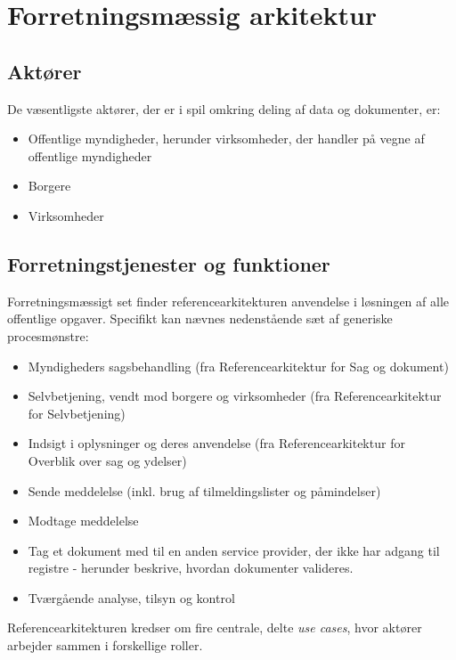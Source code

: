 \section{Forretningsmæssig
arkitektur}\label{forretningsmuxe6ssig-arkitektur}

\subsection{Aktører}\label{aktuxf8rer}

De væsentligste aktører, der er i spil omkring deling af data og
dokumenter, er:

\begin{itemize}
\tightlist
\item
  Offentlige myndigheder, herunder virksomheder, der handler på vegne af
  offentlige myndigheder
\item
  Borgere
\item
  Virksomheder
\end{itemize}

\subsection{Forretningstjenester og
funktioner}\label{forretningstjenester-og-funktioner}

Forretningsmæssigt set finder referencearkitekturen anvendelse i
løsningen af alle offentlige opgaver. Specifikt kan nævnes nedenstående
sæt af generiske procesmønstre:

\begin{itemize}
\tightlist
\item
  Myndigheders sagsbehandling (fra Referencearkitektur for Sag og
  dokument)
\item
  Selvbetjening, vendt mod borgere og virksomheder (fra
  Referencearkitektur for Selvbetjening)
\item
  Indsigt i oplysninger og deres anvendelse (fra Referencearkitektur for
  Overblik over sag og ydelser)
\item
  Sende meddelelse (inkl. brug af tilmeldingslister og påmindelser)
\item
  Modtage meddelelse
\item
  Tag et dokument med til en anden service provider, der ikke har adgang
  til registre - herunder beskrive, hvordan dokumenter valideres.
\item
  Tværgående analyse, tilsyn og kontrol
\end{itemize}

Referencearkitekturen kredser om fire centrale, delte \emph{use cases},
hvor aktører arbejder sammen i forskellige roller.

